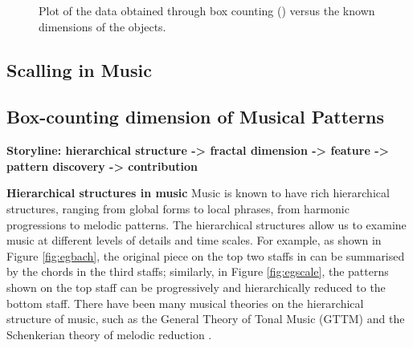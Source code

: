 \begin{figure}
\caption{Plot of the data obtained through box counting ()
versus the known dimensions of the objects.}
\label{fig:egplots}
\end{figure}

\subsection{Scalling in Music}

\subsection{Box-counting dimension of Musical Patterns}




\textbf{Storyline: hierarchical structure -> fractal dimension -> feature -> pattern discovery -> contribution }

\textbf{Hierarchical structures in music}
Music is known to have rich hierarchical structures, ranging from global forms to local phrases, from harmonic progressions to melodic patterns. 
The hierarchical structures allow us to examine music at different levels of details and time scales. For example, as shown in Figure \ref{fig:egbach}, the original piece on the top two staffs in can be summarised by the chords in the third staffs; similarly, in Figure \ref{fig:egscale}, the patterns shown on the top staff can be progressively and hierarchically reduced to the bottom staff. 
There have been many musical theories on the hierarchical structure of music, such as the General Theory of Tonal Music (GTTM) \cite{lerdahl1985generative} and the Schenkerian theory of melodic reduction \cite{forte1959schenker}.

